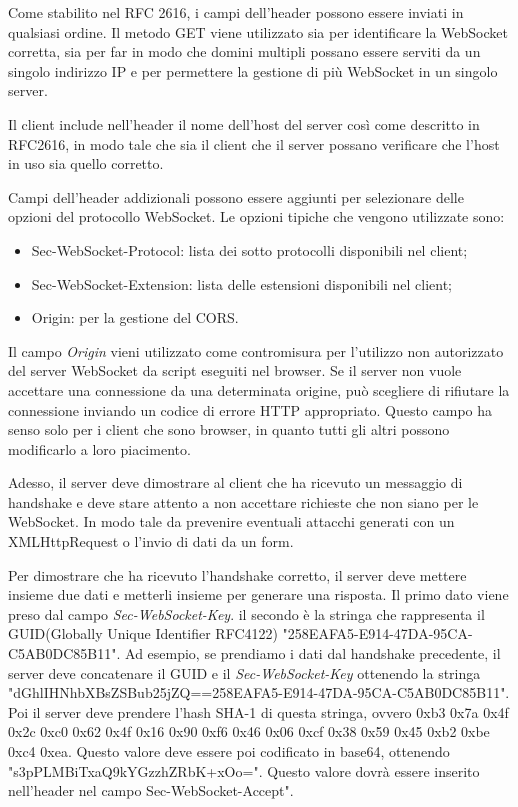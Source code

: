 Come stabilito nel RFC 2616, i campi dell'header possono essere inviati in qualsiasi ordine.  
Il metodo GET viene utilizzato sia per identificare la WebSocket corretta, sia per far in modo che domini multipli possano essere serviti da un singolo indirizzo IP e per permettere la gestione di più WebSocket in un singolo server.

Il client include nell'header il nome dell'host del server così come descritto in RFC2616\cite{RFC2616}, in modo tale che sia il client che il server
possano verificare che l'host in uso sia quello corretto.

Campi dell'header addizionali possono essere aggiunti  per selezionare
delle opzioni del protocollo WebSocket.
Le opzioni tipiche che vengono utilizzate sono:
\begin{itemize}
\item Sec-WebSocket-Protocol: lista dei sotto protocolli disponibili nel client;
\item Sec-WebSocket-Extension: lista delle estensioni disponibili nel client;
\item Origin: per la gestione del CORS.
\end{itemize}

Il campo \emph{Origin} vieni utilizzato come contromisura per 
l'utilizzo non autorizzato del server WebSocket da script eseguiti nel browser.
Se il server non vuole accettare una connessione da una determinata origine, 
può scegliere di rifiutare la connessione inviando un codice di errore HTTP appropriato.
Questo campo ha senso solo per i client che sono browser, in quanto tutti gli altri possono modificarlo a loro piacimento.

Adesso, il server deve dimostrare al client che ha ricevuto un messaggio di handshake e deve stare attento a non accettare richieste che non siano per le WebSocket.
In modo tale da prevenire eventuali attacchi generati con un XMLHttpRequest o l'invio di dati da un form.

Per dimostrare che ha ricevuto l'handshake corretto, il server deve mettere insieme due dati e metterli insieme per generare una risposta.
Il primo dato viene preso dal campo \emph{Sec-WebSocket-Key}.
il secondo è la stringa che rappresenta il GUID(Globally Unique Identifier RFC4122\cite{RFC4122}) "258EAFA5-E914-47DA-95CA-C5AB0DC85B11".
Ad esempio, se prendiamo i dati dal handshake precedente, 
il server deve concatenare il GUID e il \emph{Sec-WebSocket-Key} ottenendo la stringa "dGhlIHNhbXBsZSBub25jZQ==258EAFA5-E914-47DA-95CA-C5AB0DC85B11".
Poi il server deve prendere l'hash SHA-1 di questa stringa, ovvero 
0xb3 0x7a 0x4f 0x2c 0xc0 0x62 0x4f 0x16 0x90 0xf6 0x46 0x06 0xcf 0x38 0x59 0x45 0xb2 0xbe 0xc4 0xea.
Questo valore deve essere poi codificato in base64, 
ottenendo "s3pPLMBiTxaQ9kYGzzhZRbK+xOo=".
Questo valore dovrà essere inserito nell'header nel campo Sec-WebSocket-Accept".

